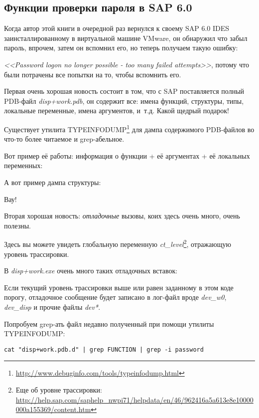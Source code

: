 \subsection{Функции проверки пароля в SAP 6.0}

Когда автор этой книги в очередной раз вернулся к своему SAP 6.0 IDES заинсталлированному в виртуальной машине VMware, он обнаружил что забыл пароль, впрочем, затем он вспомнил его, но теперь получаем такую ошибку:
 
\emph{<<Password logon no longer possible - too many failed attempts>>}, 
потому что были потрачены все попытки на то, чтобы вспомнить его.

Первая очень хорошая новость состоит в том, что с SAP поставляется полный \gls{PDB}-файл \emph{disp+work.pdb}, он содержит все: имена функций, структуры, типы, локальные переменные, имена аргументов, и~т.д. Какой щедрый подарок!

Существует утилита TYPEINFODUMP\footnote{\url{http://www.debuginfo.com/tools/typeinfodump.html}} для дампа содержимого \gls{PDB}-файлов во что-то более читаемое и grep-абельное.

Вот пример её работы: информация о функции + её аргументах + её локальных переменных:



А вот пример дампа структуры:



Вау!

Вторая хорошая новость: \emph{отладочные} вызовы, коих здесь очень много, очень полезны. 

Здесь вы можете увидеть глобальную переменную \emph{ct\_level}\footnote{Еще об уровне трассировки: \url{http://help.sap.com/saphelp_nwpi71/helpdata/en/46/962416a5a613e8e10000000a155369/content.htm}}, отражающую уровень трассировки.

В \emph{disp+work.exe} очень много таких отладочных вставок:



Если текущий уровень трассировки выше или равен заданному в этом коде порогу, 
отладочное сообщение будет записано в лог-файл вроде \emph{dev\_w0}, \emph{dev\_disp} 
и прочие файлы \emph{dev*}.

\myindex{\GrepUsage}
Попробуем grep-ать файл недавно полученный при помощи утилиты TYPEINFODUMP:

\begin{lstlisting}
cat "disp+work.pdb.d" | grep FUNCTION | grep -i password
\end{lstlisting}

